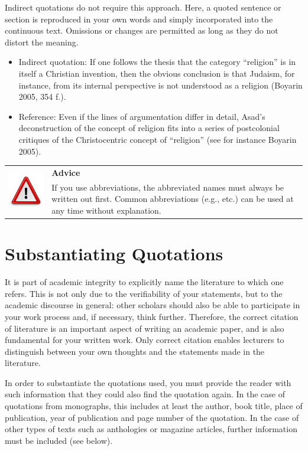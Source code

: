 \documentclass[
  english,
]{scrreprt}
\newlength{\iconwidth}
\newenvironment{displaybox}[2]{%
    \begin{center}
        \setlength\arrayrulewidth{0.75pt}%
        \arrayrulecolor{white}%
        \renewcommand{\arraystretch}{1.3}%
        \begin{tabular}{p{\iconwidth}p{\linewidth-4\tabcolsep-\iconwidth}}
            \multirow{2}{*}{#2}&\cellcolor{boxheadcol}\textbf{\sffamily\color{white}#1} \\%
            \hhline{~-}%
            &\cellcolor{boxcol}%
}{%
            \\
        \end{tabular}
        \arrayrulecolor{black}
    \end{center}
}
\newenvironment{Advice}{%
\begin{displaybox}{Advice}{\includegraphics[width=\iconwidth]{images/icon-hinweis}}}%
{\end{displaybox}}
\begin{document}
Indirect quotations do not require this approach. Here, a quoted sentence or section is reproduced in your own words and simply incorporated into the continuous text. Omissions or changes are permitted as long as they do not distort the meaning.

\begin{itemize}
\item
  Indirect quotation: If one follows the thesis that the category “religion” is in itself a Christian invention, then the obvious conclusion is that Judaism, for instance, from its internal perspective is not understood as a religion (Boyarin 2005, 354 f.).
\item
  Reference: Even if the lines of argumentation differ in detail, Asad’s deconstruction of the concept of religion fits into a series of postcolonial critiques of the Christocentric concept of “religion” (see for instance Boyarin 2005).
\end{itemize}

\begin{Advice}

If you use abbreviations, the abbreviated names must always be written out first. Common abbreviations (e.g., etc.) can be used at any time without explanation.

\end{Advice}

\section{Substantiating Quotations}\label{substantiating-quotations}

It is part of academic integrity to explicitly name the literature to which one refers. This is not only due to the verifiability of your statements, but to the academic discourse in general: other scholars should also be able to participate in your work process and, if necessary, think further. Therefore, the correct citation of literature is an important aspect of writing an academic paper, and is also fundamental for your written work. Only correct citation enables lecturers to distinguish between your own thoughts and the statements made in the literature.

In order to substantiate the quotations used, you must provide the reader with such information that they could also find the quotation again. In the case of quotations from monographs, this includes at least the author, book title, place of publication, year of publication and page number of the quotation. In the case of other types of texts such as anthologies or magazine articles, further information must be included (see below).
\end{document}
